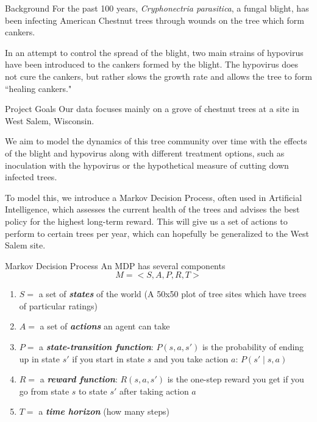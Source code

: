 \documentclass{beamer}
\begin{document}
\begin{frame}{Background}
For the past 100 years, \textit{Cryphonectria parasitica}, a fungal blight, has been infecting American Chestnut trees through wounds on the tree which form cankers. 

\medskip

In an attempt to control the spread of the blight, two main strains of hypovirus have been introduced to the cankers formed by the blight. The hypovirus does not cure the cankers, but rather slows the growth rate and allows the tree to form ``healing cankers."
\end{frame}

\begin{frame}{Project Goals}
Our data focuses mainly on a grove of chestnut trees at a site in West Salem, Wisconsin.

\medskip

We aim to model the dynamics of this tree community over time with the effects of the blight and hypovirus along with different treatment options, such as inoculation with the hypovirus or the hypothetical measure of cutting down infected trees.

\medskip

To model this, we introduce a Markov Decision Process, often used in Artificial Intelligence, which assesses the current health of the trees and advises the best policy for the highest long-term reward. This will give us a set of actions to perform to certain trees per year, which can hopefully be generalized to the West Salem site.

\end{frame}


\begin{frame}{Markov Decision Process}
An MDP has several components
$$ M = <S,A,P,R,T>$$
\begin{enumerate}
  \item $S = $ a set of \textbf{\textsl{states}} of the world (A 50x50 plot of tree sites which have trees of particular ratings)
  \item $A=$ a set of \textbf{\emph{actions}} an agent can take
  \item $P=$ a \textbf{\emph{state-transition function}}: $P(s, a, s')$ is the probability of ending up in state $s'$ if you start in state $s$ and you take action $a$: $P(s' \mid s,a)$
  \item $R=$ a \textbf{\emph{reward function}}: $R(s, a, s')$ is the one-step reward you get if you go from state $s$ to state $s'$ after taking action $a$
  \item $T=$ a \textbf{\emph{time horizon}} (how many steps)
\end{enumerate}

\end{frame}
\end{document}
